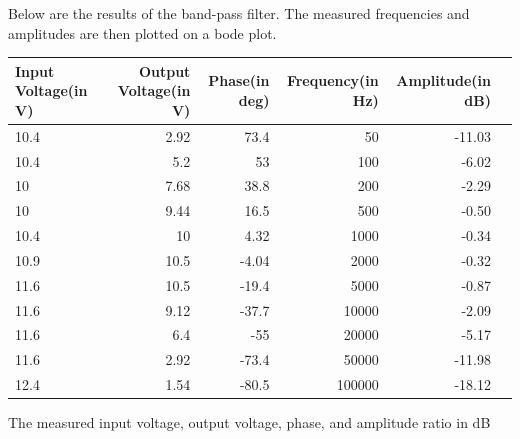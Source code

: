 Below are the results of the band-pass filter. The measured frequencies and amplitudes are then plotted on a bode plot.
\vspace{1cm}
\begin{adjustwidth}{-2.5 cm}{-2.5 cm}\centering\begin{threeparttable}[!htb]
        \scriptsize
        \begin{tabular}{lrrrrr}\toprule
            \textbf{Input Voltage(in V)} & \textbf{Output Voltage(in V)} & \textbf{Phase(in deg)} & \textbf{Frequency(in Hz)} & \textbf{Amplitude(in dB)} \\\midrule
            10.4                         & 2.92                          & 73.4                   & 50                        & -11.03                    \\
            10.4                         & 5.2                           & 53                     & 100                       & -6.02                     \\
            10                           & 7.68                          & 38.8                   & 200                       & -2.29                     \\
            10                           & 9.44                          & 16.5                   & 500                       & -0.50                     \\
            10.4                         & 10                            & 4.32                   & 1000                      & -0.34                     \\
            10.9                         & 10.5                          & -4.04                  & 2000                      & -0.32                     \\
            11.6                         & 10.5                          & -19.4                  & 5000                      & -0.87                     \\
            11.6                         & 9.12                          & -37.7                  & 10000                     & -2.09                     \\
            11.6                         & 6.4                           & -55                    & 20000                     & -5.17                     \\
            11.6                         & 2.92                          & -73.4                  & 50000                     & -11.98                    \\
            12.4                         & 1.54                          & -80.5                  & 100000                    & -18.12                    \\
            \bottomrule
        \end{tabular}
        \caption{The measured input voltage, output voltage, phase, and amplitude ratio in dB}
    \end{threeparttable}\end{adjustwidth}

